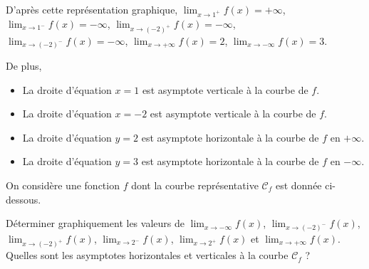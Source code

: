 \documentclass[11pt,fleqn, openany]{book} %
\begin{document}
\begin{solution}D'après cette représentation graphique,
 $\displaystyle \lim_{x \to 1^+} f(x)=+\infty$,
$\displaystyle \lim_{x \to 1^-} f(x)=-\infty$, 
 $\displaystyle \lim_{x \to (-2)^+} f(x)=-\infty$,\\  $\displaystyle \lim_{x \to (-2)^-} f(x)=-\infty$,  $\displaystyle \lim_{x \to +\infty} f(x)=2$,
$\displaystyle \lim_{x \to -\infty} f(x)=3$.


De plus,
\begin{itemize}
\item La droite d'équation $x=1$ est asymptote verticale à la courbe de $f$.
\item La droite d'équation $x=-2$ est asymptote verticale à la courbe de $f$.
\item La droite d'équation $y=2$ est asymptote horizontale à la courbe de $f$ en $+\infty$.
\item La droite d'équation $y=3$ est asymptote horizontale à la courbe de $f$ en $-\infty$.
\end{itemize}\end{solution}





\begin{exercise}On considère une fonction $f$ dont la courbe représentative $\mathcal{C}_f$ est donnée ci-dessous.

\begin{minipage}{0.45\linewidth}
\begin{center}
\end{center}\end{minipage} \hfill \begin{minipage}{0.49\linewidth}

Déterminer graphiquement les valeurs de  $\displaystyle \lim_{x \to -\infty} f(x)$, $\displaystyle \lim_{x \to (-2)^-} f(x)$, $\displaystyle \lim_{x \to (-2)^+} f(x)$, $\displaystyle \lim_{x \to 2^-} f(x)$, $\displaystyle \lim_{x \to 2^+} f(x)$ et $\displaystyle \lim_{x \to +\infty} f(x)$.
\vskip10pt
Quelles sont les asymptotes horizontales et verticales à la courbe $\mathcal{C}_f$ ?\end{minipage} \end{exercise}
\end{document}
